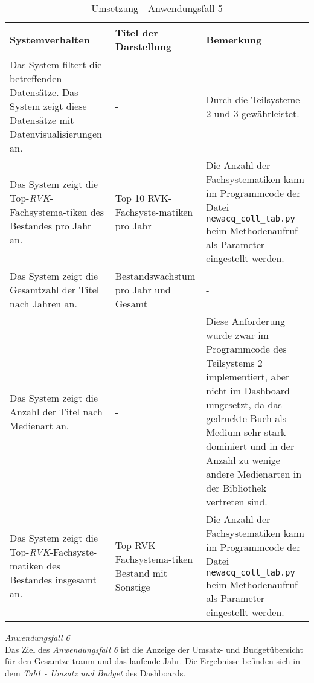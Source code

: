 \begingroup
    \setlength{\tabcolsep}{12pt} %
    \renewcommand{\arraystretch}{1.5} 
    \begin{table}[h]
        \centering
        \Large
        \begin{adjustbox}{max width=\textwidth}
        \begin{tabular}{p{}p{}p{}}
           \toprule
           Systemverhalten       &Titel der Darstellung&Bemerkung\\
           \midrule
           Das System filtert die betreffenden Datensätze. Das System zeigt diese Datensätze mit Datenvisualisierungen an.&-&Durch die Teilsysteme 2 und 3 gewährleistet.\\
           Das System zeigt die Top-\textit{\acrshort{RVK}}-Fachsystema-tiken des Bestandes pro Jahr an.&Top 10 RVK-Fachsyste-matiken pro Jahr&Die Anzahl der Fachsystematiken kann im Programmcode der Datei \texttt{newacq\_coll\_tab.py} beim Methodenaufruf als Parameter eingestellt werden.\\
           Das System zeigt die Gesamtzahl der Titel nach Jahren an.&Bestandswachstum pro Jahr und Gesamt&-\\
           Das System zeigt die Anzahl der Titel nach Medienart an.&-&Diese Anforderung wurde zwar im Programmcode des Teilsystems 2 implementiert, aber nicht im Dashboard umgesetzt, da das gedruckte Buch als Medium sehr stark dominiert und in der Anzahl zu wenige andere Medienarten in der Bibliothek vertreten sind.\\
           Das System zeigt die Top-\textit{\acrshort{RVK}}-Fachsyste-matiken des Bestandes insgesamt an.&Top RVK-Fachsystema-tiken Bestand mit Sonstige&Die Anzahl der Fachsystematiken kann im Programmcode der Datei \texttt{newacq\_coll\_tab.py} beim Methodenaufruf als Parameter eingestellt werden.\\
        \bottomrule
        \end{tabular}
        \end{adjustbox}
        \caption{%
            Umsetzung - Anwendungsfall 5
        }
        \label{tab:Anwendungsfall 5 - Umgesetzte Anforderungen}
        \end{table}
\endgroup

\clearpage
\noindent
\textit{Anwendungsfall 6}\\
Das Ziel des \textit{Anwendungsfall 6} ist die Anzeige der Umsatz- und Budgetübersicht für den Gesamtzeitraum und das laufende Jahr.
Die Ergebnisse befinden sich in dem \textit{Tab1 - Umsatz und Budget} des Dashboards.

